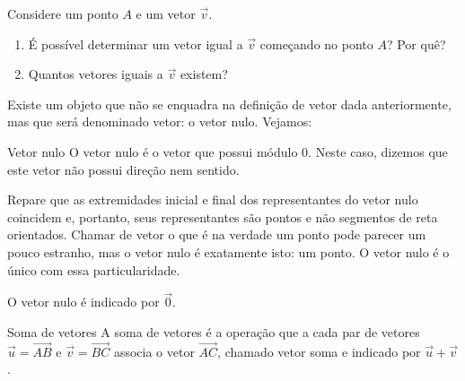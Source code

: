 \begin{reflection}

Considere um ponto \(A\) e um vetor \(\vec{v}\).
\begin{enumerate}
\item {} 
É possível determinar um vetor igual a \(\vec{v}\) começando no ponto \(A\)? Por quê?

\item {} 
Quantos vetores iguais a \(\vec{v}\) existem?

\end{enumerate}
\end{reflection}



Existe um objeto que não se enquadra na definição de vetor dada anteriormente, mas que será denominado vetor: o vetor nulo. Vejamos:
\begin{observationtitle}{Vetor nulo}
O vetor nulo é o vetor que possui módulo 0. Neste caso, dizemos que este vetor não possui direção nem sentido.
\end{observationtitle}

Repare que as extremidades inicial e final dos representantes do vetor nulo coincidem e, portanto, seus representantes são pontos e não segmentos de reta orientados. Chamar de vetor o que é na verdade um ponto pode parecer um pouco estranho, mas o vetor nulo é exatamente isto: um ponto. O vetor nulo é o único com essa particularidade.

O vetor nulo é indicado por \(\vec{0}\).
\begin{observationtitle}{Soma de vetores}
A soma de vetores é a operação que a cada par de vetores \(\vec{u}=\overrightarrow{AB}\) e \(\vec{v}=\overrightarrow{BC}\) associa o vetor \(\overrightarrow{AC}\), chamado vetor soma e indicado por \(\vec{u}+\vec{v}\).
\end{observationtitle}

